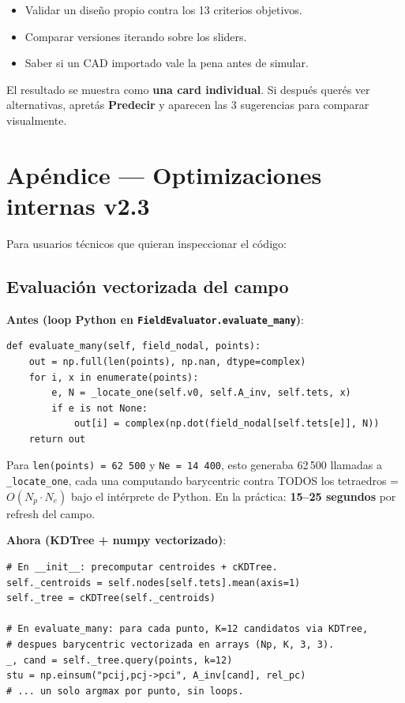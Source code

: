 \documentclass[11pt, a4paper]{article}
\newcommand{\menu}[1]{\textbf{\guillemotleft #1\guillemotright}}
\begin{document}
\begin{itemize}
  \item Validar un diseño propio contra los 13 criterios objetivos.
  \item Comparar versiones iterando sobre los sliders.
  \item Saber si un CAD importado vale la pena antes de simular.
\end{itemize}

El resultado se muestra como \textbf{una card individual}. Si después
querés ver alternativas, apretás \menu{Predecir} y aparecen las 3
sugerencias para comparar visualmente.

\section*{Apéndice --- Optimizaciones internas v2.3}

Para usuarios técnicos que quieran inspeccionar el código:

\subsection*{Evaluación vectorizada del campo}

\textbf{Antes (loop Python en \texttt{FieldEvaluator.evaluate\_many})}:

\begin{verbatim}
def evaluate_many(self, field_nodal, points):
    out = np.full(len(points), np.nan, dtype=complex)
    for i, x in enumerate(points):
        e, N = _locate_one(self.v0, self.A_inv, self.tets, x)
        if e is not None:
            out[i] = complex(np.dot(field_nodal[self.tets[e]], N))
    return out
\end{verbatim}

Para \texttt{len(points) = 62\,500} y \texttt{Ne = 14\,400}, esto
generaba 62\,500 llamadas a \texttt{\_locate\_one}, cada una
computando barycentric contra TODOS los tetraedros = $O(N_p \cdot N_e)$
bajo el intérprete de Python. En la práctica: \textbf{15--25 segundos}
por refresh del campo.

\textbf{Ahora (KDTree + numpy vectorizado)}:

\begin{verbatim}
# En __init__: precomputar centroides + cKDTree.
self._centroids = self.nodes[self.tets].mean(axis=1)
self._tree = cKDTree(self._centroids)

# En evaluate_many: para cada punto, K=12 candidatos via KDTree,
# despues barycentric vectorizada en arrays (Np, K, 3, 3).
_, cand = self._tree.query(points, k=12)
stu = np.einsum("pcij,pcj->pci", A_inv[cand], rel_pc)
# ... un solo argmax por punto, sin loops.
\end{verbatim}
\end{document}
